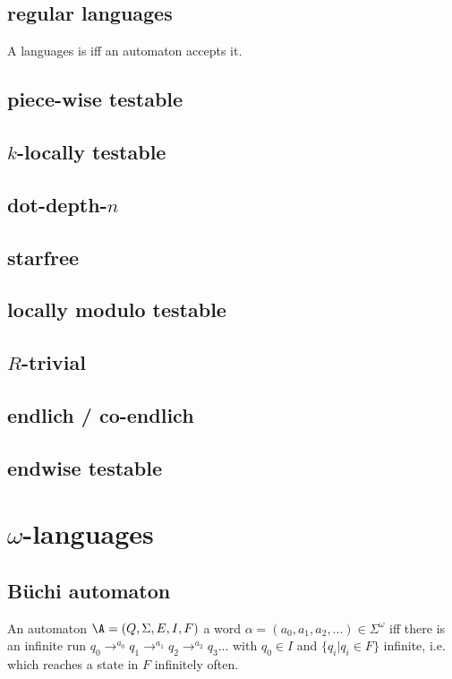 


\subsection{regular languages}
A languages is  iff an automaton accepts it.

\subsection{piece-wise testable}
\subsection{$k$-locally testable}
\subsection{dot-depth-$n$}
\subsection{starfree}
\subsection{locally modulo testable}
\subsection{$R$-trivial}
\subsection{endlich / co-endlich}
\subsection{endwise testable}

\section{$\omega$-languages}
\subsection{Büchi automaton}
An automaton $\A = (Q, \Sigma, E, I, F)$  a word $\alpha = (a_0,a_1,a_2,...) \in \Sigma^\omega$ iff there is an infinite run $q_0 \rightarrow^{a_0} q_1 \rightarrow^{a_1} q_2 \rightarrow^{a_2} q_3 ...$ with $q_0 \in I$ and $\{ q_i | q_i \in F \}$ infinite, i.e. which reaches a state in $F$ infinitely often.


